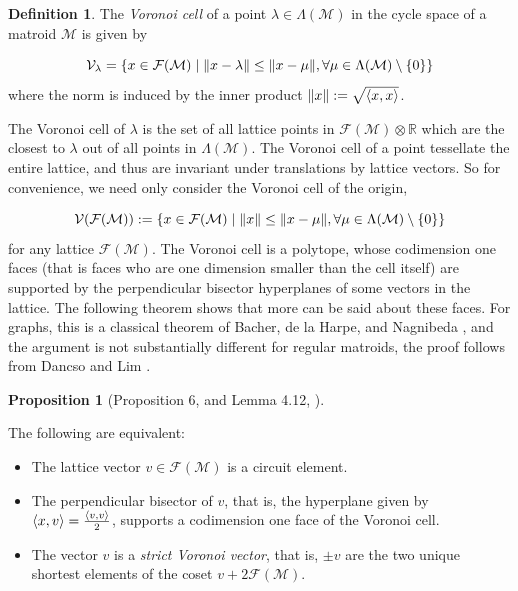 \documentclass[12pt]{report}
\theoremstyle{definition}
\newtheorem{proposition}[theorem]{Proposition}
\newtheorem{definition}[theorem]{Definition}
\DeclarePairedDelimiter\norm{\lVert}{\rVert}
\DeclarePairedDelimiter\iprod{\langle}{\rangle}
\def\R{\mathbb R}
\def\calF{\mathcal F}
\def\calM{\mathcal M}
\def\calV{\mathcal V}
\theoremstyle{upright}
\begin{document}
\begin{definition}

    The {\em Voronoi cell} of a point $\lambda\in\Lambda(\calM)$ in the cycle space of a matroid $\calM$ is given by
    
    \[\calV_\lambda=\{x\in\calF(\calM)\;|\;\norm*{x-\lambda}\leq\norm*{x-\mu}, \forall\mu\in\Lambda(\calM)\setminus\{0\}\}\]
    where the norm is induced by the inner product $\norm*{x}:=\sqrt{\iprod*{x, x}}$.
    
\end{definition}

The Voronoi cell of $\lambda$ is the set of all lattice points in $\calF(\calM)\otimes\R$ which are the closest to $\lambda$ out of all points in $\Lambda(\calM)$.
The Voronoi cell of a point tessellate the entire lattice, and thus are invariant under translations by lattice vectors.
So for convenience, we need only consider the Voronoi cell of the origin,

\[\calV(\calF(\calM)):=\{x\in\calF(\calM)\;|\;\norm*{x}\leq\norm*{x-\mu}, \forall\mu\in\Lambda(\calM)\setminus\{0\}\}\]
for any lattice $\calF(\calM)$.
The Voronoi cell is a polytope, whose codimension one faces (that is faces who are one dimension smaller than the cell itself) are supported by the perpendicular bisector hyperplanes of some vectors in the lattice.
The following theorem shows that more can be said about these faces.
For graphs, this is a classical theorem of Bacher, de la Harpe, and Nagnibeda \cite{bacher1997lattice}, and the argument is not substantially different for regular matroids, the proof follows from Dancso and Lim \cite{dancso2023lattice}.

\begin{proposition}[Proposition 6, \cite{bacher1997lattice} and Lemma 4.12, \cite{dancso2023lattice}]\label{prop:BacherCircuits}

    The following are equivalent:

    \begin{itemize}
        \item The lattice vector $v\in\calF(\calM)$ is a circuit element.
        \item The perpendicular bisector of $v$, that is, the hyperplane given by $\iprod*{x, v}=\frac{\iprod*{v, v}}{2}$, supports a codimension one face of the Voronoi cell.
        \item The vector $v$ is a \textit{strict Voronoi vector}, that is, $\pm v$ are the two unique shortest elements of the coset $v+2\calF(\calM)$.
    \end{itemize}
    
\end{proposition}
\end{document}
